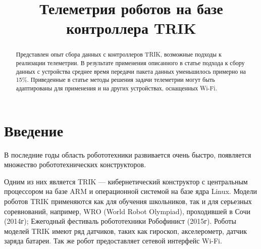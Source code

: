\documentclass[conference]{IEEEtran}
\begin{document}
%
\title{Телеметрия роботов на базе контроллера TRIK}

\author{
\and
{}
}

\maketitle

\begin{abstract}
Представлен опыт сбора данных с контроллеров TRIK, возможные подходы к реализации телеметрии. В результате применения описанного в статье подхода к сбору данных с устройства среднее время передачи пакета данных уменьшилось примерно на 15\%. Приведенные в статье методы решения задачи телеметрии могут быть адаптированы для применения и на других устройствах, оснащенных Wi-Fi.
\end{abstract}

\section{Введение}
В последние годы область робототехники развивается очень быстро, появляется множество робототехнических конструкторов.


Одним из них является TRIK \cite{trik} --- кибернетический конструктор с центральным процессором на базе ARM и операционной системой на базе ядра Linux. Модели роботов TRIK применяются как для обучения школьников, так и для серьезных соревнований, например, WRO (World Robot Olympiad), проходившей в Сочи (2014г); Ежегодный фестиваль робототехники Робофинист (2015г). Роботы моделей TRIK имеют ряд датчиков, таких как гироскоп, акселерометр, датчик заряда батареи. Так же робот предоставляет сетевой интерфейс Wi-Fi.
\end{document}
